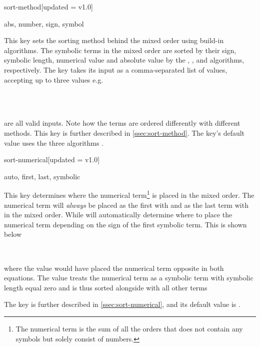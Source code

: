 	\begin{option}{sort-method}[updated = v1.0]
		\begin{values}[default = {sign, symbol, abs}]
			abs, number, sign, symbol
		\end{values}
		This key sets the sorting method behind the mixed order using build-in algorithms. The symbolic terms in the mixed order are sorted by their sign, symbolic length, numerical value and absolute value by the , ,  and  algorithms, respectively. The key takes its input as a comma-separated list of values, accepting up to three values e.g.
		
		\begin{example}
			 \\
			 \\
		\end{example}
		
		\noindent are all valid inputs. Note how the terms are ordered differently with different methods. This key is further described in \cref{ssec:sort-method}. The key's default value uses the three algorithms \val{\default}.
	\end{option}
	
	\begin{option}{sort-numerical}[updated = v1.0]
		\begin{values}[default = auto]
			auto, first, last, symbolic
		\end{values}
		This key determines where the numerical term\footnote{The numerical term is the sum of all the orders that does not contain any symbols but solely consist of numbers.\label{foot:numerical-term}} is placed in the mixed order. The numerical term will \emph{always} be placed as the first with  and as the last term with  in the mixed order. While  will automatically determine where to place the numerical term depending on the sign of the first symbolic term. This is shown below
		
		\begin{example}
			\pdv[sort-numerical=first, order={n,2}]{f}{x,y}  \\
			\pdv[sort-numerical=last, order={-n,2}]{f}{x,y}
		\end{example}
		
		\noindent where the value  would have placed the numerical term opposite in both equations. The value  treats the numerical term as a symbolic term with symbolic length equal zero and is thus sorted alongside with all other terms
		\begin{example}
			\pdv[sort-numerical=symbolic, order={2+n,-a}]{f}{x,y}
		\end{example}
		The key is further described in \cref{ssec:sort-numerical}, and its default value is \default.
	\end{option}
	
